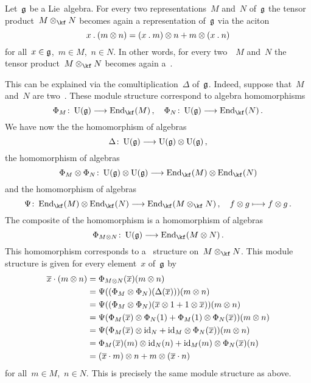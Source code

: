 \begin{remark}
  Let~$\mathfrak{g}$ be a Lie~algebra.
  For every two representations~$M$ and~$N$ of~$\mathfrak{g}$ the tensor product~$M \otimes_{\kf} N$ becomes again a representation of~$\mathfrak{g}$ via the aciton
  \[
    x \mathbin{.} (m \otimes n)
    =
    (x \mathbin{.} m) \otimes n + m \otimes (x \mathbin{.} n)
  \]
  for all~$x \in \mathfrak{g}$,~$m \in M$,~$n \in N$.
  In other words, for every two~\modules{$\Univ(\glie)$}~$M$ and~$N$ the tensor product~$M \otimes_{\kf} N$ becomes again a~\module{$\Univ(\glie)$}.

  This can be explained via the comultiplication~$\Delta$ of~$\mathfrak{g}$.
  Indeed, suppose that~$M$ and~$N$ are two~\modules{$\Univ(\glie)$}.
  These module structure correspond to algebra homomorphisms
  \[
    \Phi_M
    \colon
    \Univ(\glie)
    \to
    \End_{\kf}(M) \,,
    \quad
    \Phi_N
    \colon
    \Univ(\glie)
    \to
    \End_{\kf}(N) \,.
  \]
  We have now the the homomorphism of algebras
  \[
    \Delta
    \colon
    \Univ(\glie)
    \to
    \Univ(\glie) \otimes \Univ(\glie) \,,
  \]
  the homomorphism of algebras
  \[
    \Phi_M \otimes \Phi_N
    \colon
    \Univ(\glie) \otimes \Univ(\glie)
    \to
    \End_{\kf}(M) \otimes \End_{\kf}(N)
  \]
  and the homomorphism of algebras
  \[
    \Psi
    \colon
    \End_{\kf}(M) \otimes \End_{\kf}(N)
    \to
    \End_{\kf}(M \otimes_{\kf} N) \,,
    \quad
    f \otimes g
    \mapsto
    f \otimes g \,.
  \]
  The composite of the homomorphism is a homomorphism of algebras
  \[
    \Phi_{M \otimes N}
    \colon
    \Univ(\glie)
    \to
    \End_{\kf}(M \otimes N) \,.
  \]
  This homomorphism corresponds to a~\module{$\Univ(\glie)$} structure on~$M \otimes_{\kf} N$.
  This module structure is given for every element~$x$ of~$\mathfrak{g}$ by
  \begin{align*}
    \overline{x} \cdot (m \otimes n)
    &=
    \Phi_{M \otimes N}( \overline{x} )( m \otimes n )
    \\
    &=
    \Psi( (\Phi_M \otimes \Phi_N)( \Delta(\overline{x}) ) )( m \otimes n)
    \\
    &=
    \Psi( (\Phi_M \otimes \Phi_N)( \overline{x} \otimes 1 + 1 \otimes \overline{x} ) )( m \otimes n)
    \\
    &=
    \Psi( \Phi_M(\overline{x}) \otimes \Phi_N(1) + \Phi_M(1) \otimes \Phi_N(\overline{x}) )( m \otimes n)
    \\
    &=
    \Psi( \Phi_M(\overline{x}) \otimes \mathrm{id}_N + \mathrm{id}_M \otimes \Phi_N(\overline{x}) )( m \otimes n)
    \\
    &=
    \Phi_M(\overline{x})(m) \otimes \mathrm{id}_N(n) + \mathrm{id}_M(m) \otimes \Phi_N(\overline{x})(n)
    \\
    &=
    (\overline{x} \cdot m) \otimes n + m \otimes (\overline{x} \cdot n)
  \end{align*}
  for all~$m \in M$,~$n \in N$.
  This is precisely the same module structure as above.
\end{remark}


